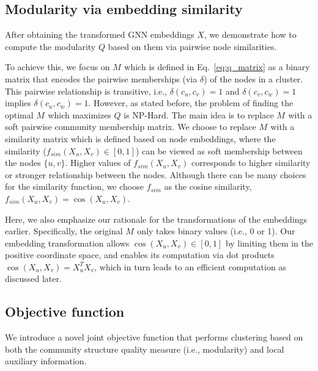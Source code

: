   









\subsection{Modularity via embedding similarity}
\label{subsec::similarity_computation}

After obtaining the transformed GNN embeddings $X$, we demonstrate how to compute the modularity $Q$ based on them via pairwise node similarities.%

To achieve this, we focus on $M_{}$ which is defined in Eq.~\ref{eq:q_matrix} as a binary matrix that encodes the pairwise memberships (via $\delta$) of the nodes in a cluster. This pairwise relationship is transitive, i.e., $\delta(c_u,c_v)=1$ and $\delta(c_v,c_w)=1$ implies $\delta(c_u,c_w)=1$.  %
However, as stated before, the problem of finding the optimal $M_{}$ which maximizes $Q$ is NP-Hard. The main idea is to replace $M_{}$ with a soft pairwise community membership matrix. We choose to replace $M_{}$ with a similarity matrix which is defined based on node embeddings, where the similarity ($f_{sim}(X_u, X_v)\in [0,1]$) can be viewed as soft membership between the nodes $\{u,v\}$.  Higher values of $f_{sim}(X_u, X_v)$ corresponds to higher similarity or stronger relationship between the nodes.  %
Although there can be many choices for the similarity function, we choose $f_{sim}$ as the cosine similarity, $f_{sim}(X_u, X_v) = \cos(X_u, X_v)$. %

Here, we also emphasize our rationale for the transformations of the embeddings earlier. Specifically, the original $M_{}$ only takes binary values (i.e., 0 or 1). Our embedding transformation allows $\cos(X_u, X_v)\in [0,1]$ by limiting them in the positive coordinate space, and enables its computation via dot products $\cos(X_u, X_v) = X_u^TX_v$, which in turn leads to an efficient computation as discussed later.




\subsection{Objective function}
\label{subsec::objective_function}

We introduce a novel joint objective function that performs clustering based on both the community structure quality measure (i.e., modularity) and local auxiliary information.


